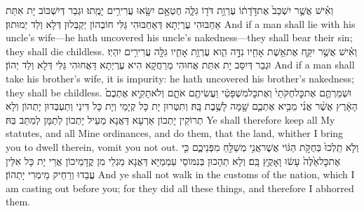 {וְאִ֗ישׁ אֲשֶׁ֤ר יִשְׁכַּב֙ אֶת\maqqaf דֹּ֣דָת֔וֹ עֶרְוַ֥ת דֹּד֖וֹ גִּלָּ֑ה חֶטְאָ֥ם יִשָּׂ֖אוּ עֲרִירִ֥ים יָמֻֽתוּ׃}
{וּגְבַר דְּיִשְׁכּוֹב יָת אִתַּת אַחְבּוּהִי עֶרְיְתָא דְּאַחְבּוּהִי גַּלִּי חוֹבְהוֹן יְקַבְּלוּן דְּלָא וְלַד יְמוּתוּן׃}
{And if a man shall lie with his uncle’s wife—he hath uncovered his uncle’s nakedness—they shall bear their sin; they shall die childless.}{}
{וְאִ֗ישׁ אֲשֶׁ֥ר יִקַּ֛ח אֶת\maqqaf אֵ֥שֶׁת אָחִ֖יו נִדָּ֣ה הִ֑וא עֶרְוַ֥ת אָחִ֛יו גִּלָּ֖ה עֲרִירִ֥ים יִהְיֽוּ׃}
{וּגְבַר דְּיִסַּב יָת אִתַּת אֲחוּהִי מְרַחֲקָא הִיא עֶרְיְתָא דַּאֲחוּהִי גַּלִּי דְּלָא וְלַד יְהוֹן׃}
{And if a man shall take his brother’s wife, it is impurity: he hath uncovered his brother’s nakedness; they shall be childless.}{}
{וּשְׁמַרְתֶּ֤ם אֶת\maqqaf כׇּל\maqqaf חֻקֹּתַי֙ וְאֶת\maqqaf כׇּל\maqqaf מִשְׁפָּטַ֔י וַעֲשִׂיתֶ֖ם אֹתָ֑ם וְלֹא\maqqaf תָקִ֤יא אֶתְכֶם֙ הָאָ֔רֶץ אֲשֶׁ֨ר אֲנִ֜י מֵבִ֥יא אֶתְכֶ֛ם שָׁ֖מָּה לָשֶׁ֥בֶת בָּֽהּ׃}
{וְתִטְּרוּן יָת כָּל קְיָמַי וְיָת כָּל דִּינַי וְתַעְבְּדוּן יָתְהוֹן וְלָא תְרוֹקֵין יָתְכוֹן אַרְעָא דַּאֲנָא מַעֵיל יָתְכוֹן לְתַמָּן לְמִתַּב בַּהּ׃}
{Ye shall therefore keep all My statutes, and all Mine ordinances, and do them, that the land, whither I bring you to dwell therein, vomit you not out.}{}
{וְלֹ֤א תֵֽלְכוּ֙ בְּחֻקֹּ֣ת הַגּ֔וֹי אֲשֶׁר\maqqaf אֲנִ֥י מְשַׁלֵּ֖חַ מִפְּנֵיכֶ֑ם כִּ֤י אֶת\maqqaf כׇּל\maqqaf אֵ֙לֶּה֙ עָשׂ֔וּ וָאָקֻ֖ץ בָּֽם׃}
{וְלָא תְהָכוּן בְּנִמּוֹסֵי עַמְמַיָּא דַּאֲנָא מַגְלֵי מִן קֳדָמֵיכוֹן אֲרֵי יָת כָּל אִלֵּין עֲבַדוּ וְרַחֵיק מֵימְרִי יָתְהוֹן׃}
{And ye shall not walk in the customs of the nation, which I am casting out before you; for they did all these things, and therefore I abhorred them.}{}
